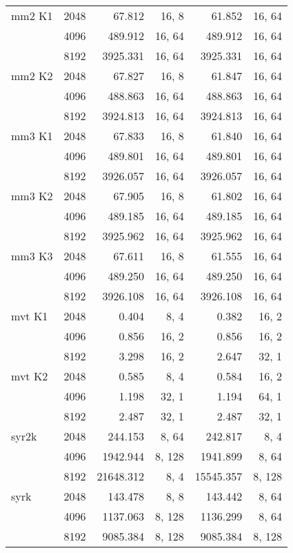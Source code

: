 \begin{table}
\begin{tabular}{lr|rr|rr}
mm2 K1 
& 2048 &      67.812 &   16, 8 &      61.852 &     16, 64 \\
& 4096 &   489.912 &  16, 64 &    489.912 &    16, 64 \\
& 8192 &   3925.331 &  16, 64 &   3925.331 &    16, 64 \\
mm2 K2 
& 2048 &      67.827 &   16, 8 &      61.847 &     16, 64 \\
& 4096 &    488.863 &  16, 64 &    488.863 &    16, 64 \\
& 8192 &   3924.813 &  16, 64 &   3924.813 &    16, 64 \\
mm3 K1 
& 2048 &      67.833 &   16, 8 &      61.840 &     16, 64 \\
& 4096 &    489.801 &  16, 64 &    489.801 &    16, 64 \\
& 8192 &   3926.057 &  16, 64 &   3926.057 &    16, 64 \\
mm3 K2 
& 2048 &      67.905 &   16, 8 &      61.802 &     16, 64 \\
& 4096 &    489.185 &  16, 64 &    489.185 &    16, 64 \\
& 8192 &   3925.962 &  16, 64 &   3925.962 &    16, 64 \\
mm3 K3 
& 2048 &      67.611 & 16, 8 &     61.555 &     16, 64 \\
& 4096 &    489.250 &  16, 64 &    489.250 &    16, 64 \\
& 8192 &   3926.108 &  16, 64 &   3926.108 &    16, 64 \\
mvt K1 
& 2048 &      0.404 &   8, 4 &     0.382 &     16, 2 \\
& 4096 &      0.856 &   16, 2 &     0.856 &    16, 2 \\
& 8192 &     3.298 &  16, 2 &      2.647 &     32, 1 \\
mvt K2 
& 2048 &      0.585 &   8, 4 &      0.584 &    16, 2 \\
& 4096 &      1.198 &  32, 1 &      1.194 &    64, 1 \\
& 8192 &      2.487 &  32, 1 &      2.487 &    32, 1 \\
syr2k 
& 2048 &      244.153 &   8, 64 &      242.817 &     8, 4 \\
& 4096 &   1942.944 &   8, 128 &   1941.899 &     8, 64 \\
& 8192 &  21648.312 &  8, 4 &  15545.357 &      8, 128 \\
syrk 
& 2048 &      143.478 &   8, 8 &      143.442 &    8, 64 \\
& 4096 &   1137.063 &   8, 128 &   1136.299 &    8, 64\\
& 8192 &  9085.384 &  8, 128 &   9085.384 &    8, 128 \\
\bottomrule
\end{tabular}
\end{table}